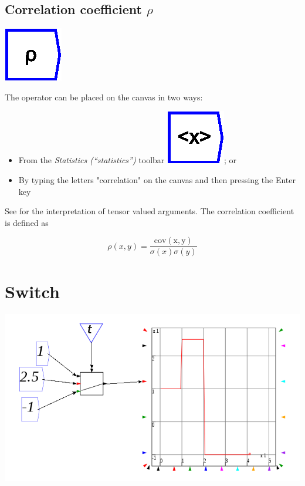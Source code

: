 \subsection{Correlation coefficient $\rho$}

\label{Operation:rho}

\includegraphics{images/rhoCorrelationCoefficient}

The operator can be placed on the canvas in two ways:
\begin{itemize}
\item From the \emph{Statistics (``statistics'')} toolbar \includegraphics{images/mean};
or 
\item By typing the letters "correlation" on the canvas and then pressing
the Enter key
\end{itemize}
See  for the interpretation
of tensor valued arguments. The correlation coefficient is defined
as

\[
\rho(x,y)=\frac{\mathrm{cov(x,y)}}{\sigma(x)\sigma(y)}
\]


\section{Switch}

\label{SwitchIcon}

\includegraphics{images/switch}

